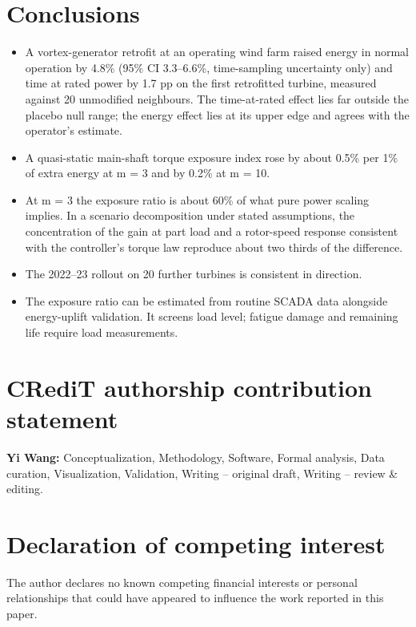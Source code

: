 \documentclass[preprint,12pt]{elsarticle}
\begin{document}
\section{Conclusions}

\begin{itemize}
\item
  A vortex-generator retrofit at an operating wind farm raised energy in normal operation by 4.8\% (95\% CI 3.3--6.6\%, time-sampling uncertainty only) and time at rated power by 1.7 pp on the first retrofitted turbine, measured against 20 unmodified neighbours. The time-at-rated effect lies far outside the placebo null range; the energy effect lies at its upper edge and agrees with the operator's estimate.
\item
  A quasi-static main-shaft torque exposure index rose by about 0.5\% per 1\% of extra energy at m = 3 and by 0.2\% at m = 10.
\item
  At m = 3 the exposure ratio is about 60\% of what pure power scaling implies. In a scenario decomposition under stated assumptions, the concentration of the gain at part load and a rotor-speed response consistent with the controller's torque law reproduce about two thirds of the difference.
\item
  The 2022--23 rollout on 20 further turbines is consistent in direction.
\item
  The exposure ratio can be estimated from routine SCADA data alongside energy-uplift validation. It screens load level; fatigue damage and remaining life require load measurements.
\end{itemize}


\section*{CRediT authorship contribution statement}

\textbf{Yi Wang:} Conceptualization, Methodology, Software, Formal analysis, Data curation, Visualization, Validation, Writing -- original draft, Writing -- review \& editing.

\section*{Declaration of competing interest}

The author declares no known competing financial interests or personal relationships that could have appeared to influence the work reported in this paper.
\end{document}
